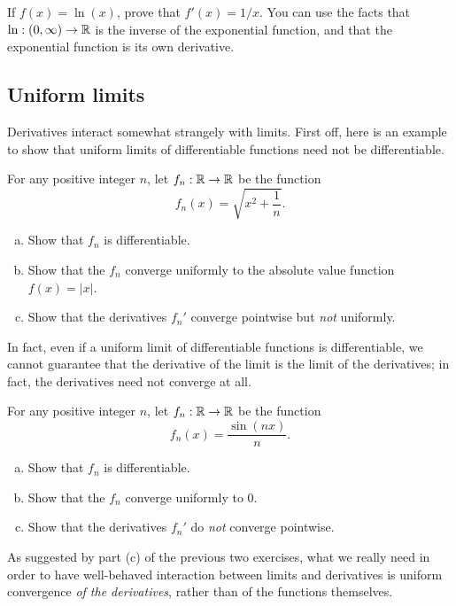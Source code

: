 \begin{exercise} \label{derivative-log-proof}
	If $f(x) = \ln(x)$, prove that $f'(x) = 1/x$. You can use the facts that $\ln : (0, \infty) \to \mathbb{R}$ is the inverse of the exponential function, and that the exponential function is its own derivative. 
\end{exercise}

\subsection{Uniform limits \starred} \label{uniform-limit}

Derivatives interact somewhat strangely with limits. First off, here is an example to show that uniform limits of differentiable functions need not be differentiable. 

\begin{exercise}
	For any positive integer $n$, let $f_n : \mathbb{R} \to \mathbb{R}$ be the function
	\[ f_n(x) = \sqrt{x^2 + \frac{1}{n}}. \]
	\begin{enumerate}[(a)]
		\item Show that $f_n$ is differentiable. 
		\item Show that the $f_n$ converge uniformly to the absolute value function $f(x) = |x|$. 
		\item Show that the derivatives $f_n'$ converge pointwise but \emph{not} uniformly. 
	\end{enumerate}
\end{exercise}

In fact, even if a uniform limit of differentiable functions is differentiable, we cannot guarantee that the derivative of the limit is the limit of the derivatives; in fact, the derivatives need not converge at all.  

\begin{exercise}
	For any positive integer $n$, let $f_n : \mathbb{R} \to \mathbb{R}$ be the function 
	\[ f_n(x) = \frac{\sin(nx)}{n}. \]
	\begin{enumerate}[(a)]
		\item Show that $f_n$ is differentiable. 
		\item Show that the $f_n$ converge uniformly to 0. 
		\item Show that the derivatives $f_n'$ do \emph{not} converge pointwise. 
	\end{enumerate}
\end{exercise}

As suggested by part (c) of the previous two exercises, what we really need in order to have well-behaved interaction between limits and derivatives is uniform convergence \emph{of the derivatives}, rather than of the functions themselves. 

